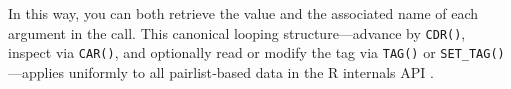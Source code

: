 In this way, you can both retrieve the value and the associated name of each argument in the call.  This canonical looping structure—advance by \texttt{CDR()}, inspect via \texttt{CAR()}, and optionally read or modify the tag via \texttt{TAG()} or \texttt{SET\_TAG()}—applies uniformly to all pairlist‐based data in the R internals API \cite{hadley-r-internals-pairlists}.

